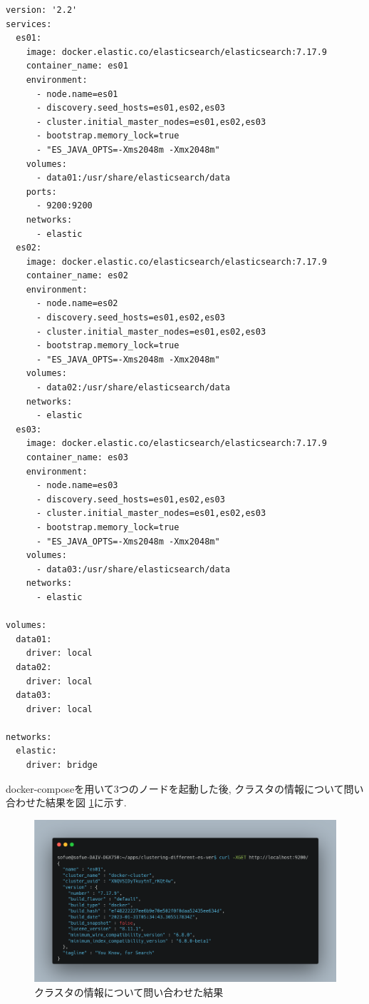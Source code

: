 \documentclass[a4j,12pt,]{jarticle}
\begin{document}
\begin{lstlisting}[caption=クラスタBの構築の際に使用したdocker-compose.yml, label=sc2]
version: '2.2'
services:
  es01:
    image: docker.elastic.co/elasticsearch/elasticsearch:7.17.9
    container_name: es01
    environment:
      - node.name=es01
      - discovery.seed_hosts=es01,es02,es03
      - cluster.initial_master_nodes=es01,es02,es03
      - bootstrap.memory_lock=true
      - "ES_JAVA_OPTS=-Xms2048m -Xmx2048m"
    volumes:
      - data01:/usr/share/elasticsearch/data
    ports:
      - 9200:9200
    networks:
      - elastic
  es02:
    image: docker.elastic.co/elasticsearch/elasticsearch:7.17.9
    container_name: es02
    environment:
      - node.name=es02
      - discovery.seed_hosts=es01,es02,es03
      - cluster.initial_master_nodes=es01,es02,es03
      - bootstrap.memory_lock=true
      - "ES_JAVA_OPTS=-Xms2048m -Xmx2048m"
    volumes:
      - data02:/usr/share/elasticsearch/data
    networks:
      - elastic
  es03:
    image: docker.elastic.co/elasticsearch/elasticsearch:7.17.9
    container_name: es03
    environment:
      - node.name=es03
      - discovery.seed_hosts=es01,es02,es03
      - cluster.initial_master_nodes=es01,es02,es03
      - bootstrap.memory_lock=true
      - "ES_JAVA_OPTS=-Xms2048m -Xmx2048m"
    volumes:
      - data03:/usr/share/elasticsearch/data
    networks:
      - elastic

volumes:
  data01:
    driver: local
  data02:
    driver: local
  data03:
    driver: local

networks:
  elastic:
    driver: bridge
\end{lstlisting}

docker-composeを用いて3つのノードを起動した後, クラスタの情報について問い合わせた結果を図 \ref{p2-1}に示す.

\begin{figure}[H]
  \begin{center}
    \includegraphics[width=160mm]{3nodes-cluster.png}
    \caption{クラスタの情報について問い合わせた結果}
    \label{p2-1}
  \end{center}
\end{figure}
\end{document}
